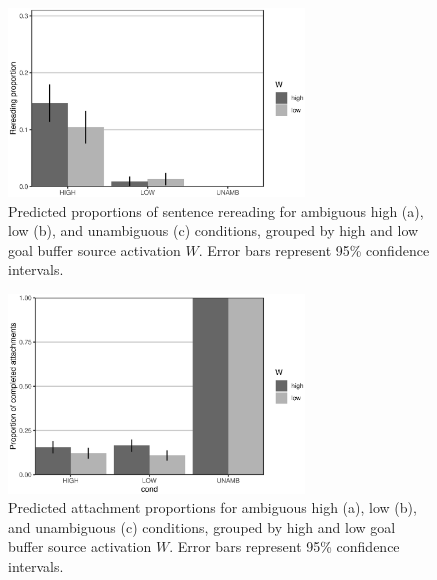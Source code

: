\documentclass{cambridge7A}\usepackage[]{graphicx}\usepackage[]{color}
\newenvironment{knitrout}{}{} %
\begin{document}
\begin{figure}[!htbp]
  \centering
\begin{knitrout}
\color{fgcolor}

{\centering \includegraphics[width=0.7\textwidth]{figures/fig-mv13modelrer-1} 

}



\end{knitrout}
\caption[Predicted proportions of sentence rereading by source activation at ambiguous and unambiguous attachments.]{Predicted proportions of sentence rereading for ambiguous high (a), low (b), and unambiguous (c) conditions, grouped by high and low goal buffer source activation $W$. Error bars represent 95\% confidence intervals.}
  \label{fig:mv13model:rer}
\end{figure}

\begin{figure}[!htbp]
\centering
\begin{knitrout}
\color{fgcolor}

{\centering \includegraphics[width=0.7\textwidth]{figures/fig-mv13modelatt-1} 

}



\end{knitrout}
\caption[Predicted attachment proportions by source activation at ambiguous and unambiguous attachments.]{Predicted attachment proportions for ambiguous high (a), low (b), and unambiguous (c) conditions, grouped by high and low goal buffer source activation $W$. Error bars represent 95\% confidence intervals.}
  \label{fig:mv13model:att}
\end{figure}
\end{document}
